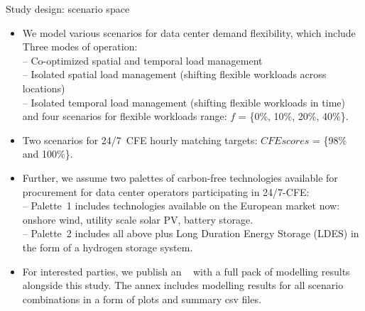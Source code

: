 \begin{frame}{Study design: scenario space}

  {\footnotesize 
  \begin{itemize}

  \item We model various scenarios for data center demand flexibility, which include \\
  \vspace{0.1cm}
  Three modes of operation: \\
    -- Co-optimized \alert{spatial and temporal} load management \\
    -- Isolated \alert{spatial} load management (shifting flexible workloads across locations)\\ 
    -- Isolated \alert{temporal} load management (shifting flexible workloads in time) \\ 
  \vspace{0.1cm}
  and four scenarios for flexible workloads range: \alert{$f$ = \{0\%, 10\%, 20\%, 40\%\}}.

  \item Two scenarios for 24/7~CFE hourly matching targets:
  \alert{$CFE scores$ = \{98\% and 100\%\}}.
  
  \item Further, we assume two palettes of carbon-free technologies available for procurement for data center operators participating in 24/7-CFE: \\
  \vspace{0.1cm}
  -- \alert{Palette~1} includes technologies available on the European market now: onshore wind, utility scale solar PV, battery storage. \\
  -- \alert{Palette~2} includes all above plus Long Duration Energy Storage (LDES) in the form of a hydrogen storage system. 

  \item For interested parties, we publish an \faLink~ with a full pack of modelling results alongside this study. The annex includes modelling results for all scenario combinations in a form of plots and summary csv files. 

  \end{itemize}
  }
\end{frame}



